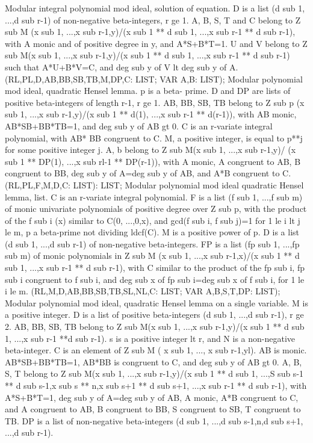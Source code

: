 \bcom Modular integral polynomial mod ideal, solution of equation. D is a
list (d sub 1, ...,d sub r-1) of non-negative beta-integers, r ge 1.
A, B, S, T and C belong to Z sub M (x sub 1, ...,x sub r-1,y)/(x sub 1 **
d sub 1, ...,x sub r-1 ** d sub r-1), with A monic and of positive
degree in y, and A*S+B*T=1.  U and V belong to Z sub M(x sub 1, ...,x
sub r-1,y)/(x sub 1 ** d sub 1, ...,x sub r-1 ** d sub r-1) such
that A*U+B*V=C, and deg sub y of V lt deg sub y of A. \ecom 
{} (RL,PL,D,AB,BB,SB,TB,M,DP,C: LIST; VAR A,B: LIST); \eproc
\bcom Modular polynomial mod ideal, quadratic Hensel lemma. p is a beta-
prime.  D and DP are lists of positive beta-integers of length r-1, r
ge 1.  AB, BB, SB, TB belong to Z sub p (x sub 1, ...,x sub r-1,y)/(x sub
1 ** d(1), ...,x sub r-1 ** d(r-1)), with AB monic, AB*SB+BB*TB=1, and
deg sub y of AB gt 0.  C is an r-variate integral polynomial, with AB*
BB congruent to C.  M, a positive integer, is equal to p**j for some
positive integer j.  A, b belong to Z sub M(x sub 1, ...,x sub r-1,y)/
(x sub 1 ** DP(1), ...,x sub rl-1 ** DP(r-1)), with A monic, A
congruent to AB, B congruent to BB, deg sub y of A=deg sub y of AB, and
A*B congruent to C. \ecom 
{} (RL,PL,F,M,D,C: LIST): LIST; \eproc
\bcom Modular polynomial mod ideal quadratic Hensel lemma, list. C is an
r-variate integral polynomial.  F is a list (f sub 1, ...,f sub m)
of monic univariate polynomials of positive degree over Z sub p, with
the product of the f sub i (x) similar to C(0, ...,0,x), and gcd(f
sub i, f sub j)=1 for 1 le i lt j le m, p a beta-prime not
dividing ldcf(C).  M is a positive power of p.  D is a list (d
sub 1, ...,d sub r-1) of non-negative beta-integers.  FP is a list (fp
sub 1, ...,fp sub m) of monic polynomials in Z sub M (x sub 1, ...,x
sub r-1,x)/(x sub 1 ** d sub 1, ...,x sub r-1 ** d sub r-1), with
C similar to the product of the fp sub i, fp sub i congruent to f
sub i, and deg sub x of fp sub i=deg sub x of f sub i, for 1 le
i le m. \ecom 
{} (RL,M,D,AB,BB,SB,TB,SL,NL,C: LIST; VAR A,B,S,T,DP: LIST); \eproc
\bcom Modular polynomial mod ideal, quadratic Hensel lemma on a single variable.
M is a positive integer.  D is a list of positive beta-integers 
(d sub 1, ...,d sub r-1), r ge 2.  AB, BB, SB, TB belong to
Z sub M(x sub 1, ...,x sub r-1,y)/(x sub 1 ** d sub 1, ...,x sub r-1
**d sub r-1).  s is a positive integer lt r, and N is a
non-negative  beta-integer.  C is an element of Z sub M ( x sub 1, ...,
x sub r-1,yl).  AB is monic. AB*SB+BB*TB=1, AB*BB is congruent to C, 
and deg sub y of AB gt 0. 
A, B, S, T belong to Z sub M(x sub 1, ...,x sub r-1,y)/(x
sub 1 ** d sub 1, ...,S sub s-1 ** d sub s-1,x sub s ** n,x sub
s+1 ** d sub s+1, ...,x sub r-1 ** d sub r-1), with A*S+B*T=1, deg
sub y of A=deg sub y of AB, A monic, A*B congruent to C, and A congruent
to AB, B congruent to BB, S congruent to SB, T congruent to TB.  DP is
a list of non-negative beta-integers (d sub 1, ...,d sub
s-1,n,d sub s+1, ...,d sub r-1). \ecom 
